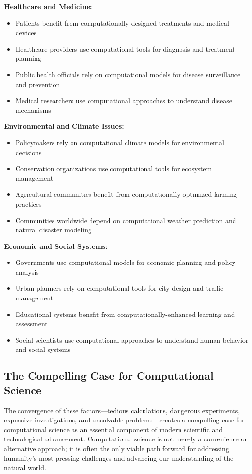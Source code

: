 \textbf{Healthcare and Medicine:}
\begin{itemize}
    \item Patients benefit from computationally-designed treatments and medical devices
    \item Healthcare providers use computational tools for diagnosis and treatment planning
    \item Public health officials rely on computational models for disease surveillance and prevention
    \item Medical researchers use computational approaches to understand disease mechanisms
\end{itemize}

\textbf{Environmental and Climate Issues:}
\begin{itemize}
    \item Policymakers rely on computational climate models for environmental decisions
    \item Conservation organizations use computational tools for ecosystem management
    \item Agricultural communities benefit from computationally-optimized farming practices
    \item Communities worldwide depend on computational weather prediction and natural disaster modeling
\end{itemize}

\textbf{Economic and Social Systems:}
\begin{itemize}
    \item Governments use computational models for economic planning and policy analysis
    \item Urban planners rely on computational tools for city design and traffic management
    \item Educational systems benefit from computationally-enhanced learning and assessment
    \item Social scientists use computational approaches to understand human behavior and social systems
\end{itemize}

\subsection{The Compelling Case for Computational Science}

The convergence of these factors—tedious calculations, dangerous experiments, expensive investigations, and unsolvable problems—creates a compelling case for computational science as an essential component of modern scientific and technological advancement. Computational science is not merely a convenience or alternative approach; it is often the only viable path forward for addressing humanity's most pressing challenges and advancing our understanding of the natural world.

